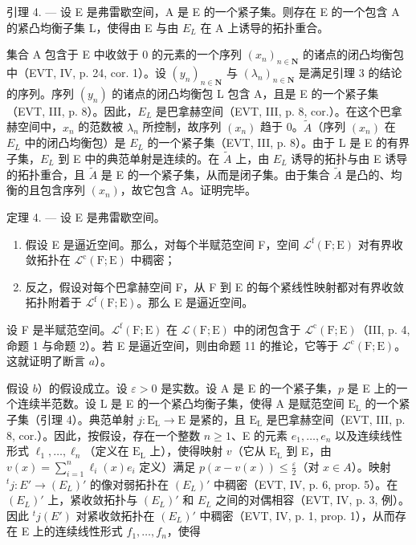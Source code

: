 引理 4. — 设 E 是弗雷歇空间，A 是 E 的一个紧子集。则存在 E 的一个包含 A 的紧凸均衡子集 L，使得由 E 与由 \(E_{L}\) 在 A 上诱导的拓扑重合。

集合 A 包含于 E 中收敛于 0 的元素的一个序列 \((x_{n})_{n\in\mathbf{N}}\) 的诸点的闭凸均衡包中（EVT, IV, p. 24, cor. 1）。设 \((y_{n})_{n\in\mathbf{N}}\) 与 \((\lambda_{n})_{n\in\mathbf{N}}\) 是满足引理 3 的结论的序列。序列 \((y_{n})\) 的诸点的闭凸均衡包 L 包含 A，且是 E 的一个紧子集（EVT, III, p. 8）。因此，\(E_{L}\) 是巴拿赫空间（EVT, III, p. 8, cor.）。在这个巴拿赫空间中，\(x_{n}\) 的范数被 \(\lambda_{n}\) 所控制，故序列 \((x_{n})\) 趋于 0。\(\widetilde{A}\)（序列 \((x_{n})\) 在 \(E_{L}\) 中的闭凸均衡包）是 \(E_{L}\) 的一个紧子集（EVT, III, p. 8）。由于 L 是 E 的有界子集，\(E_{L}\) 到 E 中的典范单射是连续的。在 \(\widetilde{A}\) 上，由 \(E_{L}\) 诱导的拓扑与由 E 诱导的拓扑重合，且 \(\widetilde{A}\) 是 E 的一个紧子集，从而是闭子集。由于集合 \(\widetilde{A}\) 是凸的、均衡的且包含序列 \((x_{n})\)，故它包含 A。证明完毕。

定理 4. --- 设 E 是弗雷歇空间。

\begin{enumerate}
\def\labelenumi{\alph{enumi})}
\item
  假设 E 是逼近空间。那么，对每个半赋范空间 F，空间 \(\mathcal{L}^{\mathrm{f}}(\mathrm{F};\mathrm{E})\) 对有界收敛拓扑在 \(\mathcal{L}^{\mathrm{c}}(\mathrm{F};\mathrm{E})\) 中稠密；
\item
  反之，假设对每个巴拿赫空间 F，从 F 到 E 的每个紧线性映射都对有界收敛拓扑附着于 \(\mathcal{L}^{\mathrm{f}}(\mathrm{F};\mathrm{E})\)。那么 E 是逼近空间。
\end{enumerate}

设 F 是半赋范空间。\(\mathcal{L}^{\mathrm{f}}(\mathrm{F};\mathrm{E})\) 在 \(\mathcal{L}(\mathrm{F};\mathrm{E})\) 中的闭包含于 \(\mathcal{L}^{\mathrm{c}}(\mathrm{F};\mathrm{E})\)（III, p. 4, 命题 1 与命题 2）。若 E 是逼近空间，则由命题 11 的推论，它等于 \(\mathcal{L}^{\mathrm{c}}(\mathrm{F};\mathrm{E})\)。这就证明了断言 \(a\)）。

假设 \(b\)）的假设成立。设 \(\varepsilon > 0\) 是实数。设 A 是 E 的一个紧子集，\(p\) 是 E 上的一个连续半范数。设 L 是 E 的一个紧凸均衡子集，使得 A 是赋范空间 \(\mathrm{E_L}\) 的一个紧子集（引理 4）。典范单射 \(j: \mathrm{E_L} \to \mathrm{E}\) 是紧的，且 \(\mathrm{E_L}\) 是巴拿赫空间（EVT, III, p. 8, cor.）。因此，按假设，存在一个整数 \(n \geqslant 1\)、E 的元素 \(e_1, \ldots, e_n\) 以及连续线性形式 \(\ell_1, \ldots, \ell_n\)（定义在 \(\mathrm{E_L}\) 上），使得映射 \(v\)（它从 \(\mathrm{E_L}\) 到 E，由 \(v(x) = \sum_{i=1}^{n} \ell_i(x)e_i\) 定义）满足 \(p(x - v(x)) \leqslant \frac{\varepsilon}{2}\)（对 \(x \in A\)）。映射 \({}^{t}j: E' \to (E_{L})'\) 的像对弱拓扑在 \((E_{L})'\) 中稠密（EVT, IV, p. 6, prop. 5）。在 \((E_{L})'\) 上，紧收敛拓扑与 \((E_{L})'\) 和 \(E_{L}\) 之间的对偶相容（EVT, IV, p. 3, 例）。因此 \({}^{t}j(E')\) 对紧收敛拓扑在 \((E_{L})'\) 中稠密（EVT, IV, p. 1, prop. 1），从而存在 E 上的连续线性形式 \(f_{1}, \ldots, f_{n}\)，使得

